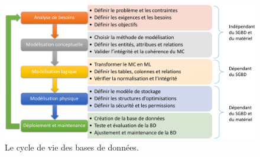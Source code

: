 \begin{figure}
\begin{center}
\includegraphics[scale=0.5]{chapitre2/chap2Fig/db-lifecycle.pdf}
\caption{Le cycle de vie des bases de données.}
 \label{fig:db-lifecycle}
\end{center}
\end{figure}

